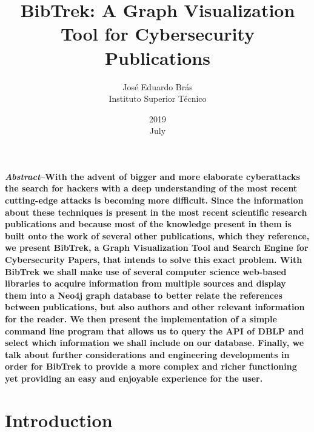 \documentclass[twocolumn]{article}
\begin{document}
\title{\textbf{BibTrek: A Graph Visualization Tool for Cybersecurity Publications}}
\date{}
\author{Jos\'{e} Eduardo Br\'{a}s\\Instituto Superior T\'{e}cnico}
\date{2019\\ July}
\maketitle

\textbf{\textit{Abstract}--With the advent of bigger and more elaborate cyberattacks the search for hackers with a deep understanding of the most recent cutting-edge attacks is becoming more difficult. Since the information about these techniques is present in the most recent scientific research publications and because most of the knowledge present in them is built onto the work of several other publications, which they reference, we present BibTrek, a Graph Visualization Tool and Search Engine for Cybersecurity Papers, that intends to solve this exact problem. With BibTrek we shall make use of several computer science web-based libraries to acquire information from multiple sources and display them into a Neo4j graph database to better relate the references between publications, but also authors and other relevant information for the reader. We then present the implementation of a simple command line program that allows us to query the API of DBLP and select which information we shall include on our database. Finally, we talk about further considerations and engineering developments in order for BibTrek to provide a more complex and richer functioning yet providing an easy and enjoyable experience for the user.}

\section{Introduction}
\end{document}
